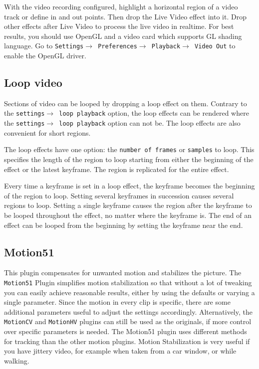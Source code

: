 With the video recording configured, highlight a horizontal region of a video track or define in and out points. Then drop the Live Video effect into it. Drop other effects after Live Video to process the live video in realtime. For best results, you should use OpenGL and a video card which supports GL shading language. Go to \texttt{Settings$\rightarrow$ Preferences$\rightarrow$ Playback$\rightarrow$ Video Out} to enable the OpenGL driver.

\subsection{Loop video}%
\label{sub:loop_video}

Sections of video can be looped by dropping a loop effect on them. Contrary to the \texttt{settings$\rightarrow$ loop playback} option, the loop effects can be rendered where the \texttt{settings$\rightarrow$ loop playback} option can not be. The loop effects are also convenient for short regions.

The loop effects have one option: the \texttt{number of frames} or \texttt{samples} to loop. This specifies the length of the region to loop starting from either the beginning of the effect or the latest keyframe. The region is replicated for the entire effect.

Every time a keyframe is set in a loop effect, the keyframe becomes the beginning of the region to loop. Setting several keyframes in succession causes several regions to loop. Setting a single keyframe causes the region after the keyframe to be looped throughout the effect, no matter where the keyframe is. The end of an effect can be looped from the beginning by setting the keyframe near the end.

\subsection{Motion51}%
\label{sub:motion51}

This plugin compensates for unwanted motion and stabilizes the picture. The \texttt{Motion51} Plugin simplifies motion stabilization so that without a lot of tweaking you can easily achieve reasonable results, either by using the defaults or varying a single parameter. Since the motion in every clip is specific, there are some additional parameters useful to adjust the settings accordingly. Alternatively, the \texttt{MotionCV} and \texttt{MotionHV} plugins can still be used as the originals, if more control over specific parameters is needed. The Motion51 plugin uses different methods for tracking than the other motion plugins. Motion Stabilization is very useful if you have jittery video, for example when taken from a car window, or while walking.

